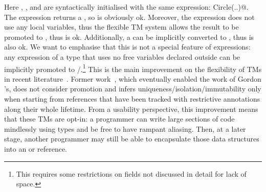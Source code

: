 Here \Q@mc@, \Q@cc@, and \Q@ic@ are syntactically initialised with the same expression: \Q@new Circle(..)@.
The \Q@new@ expression returns a \Q@mut@, so \Q@mc@ is obviously ok.
Moreover, the expression does not use any \Q@mut@ local variables, thus the flexible TM system
allows the \Q@mut@ result to be promoted to \Q@capsule@, thus \Q@cc@ is ok. 
Additionally, a \Q@capsule@ can be implicitly converted to \Q@imm@, thus \Q@ic@ is also ok.
We want to emphasise that this is not a special feature of \Q@new@ expressions:
any expression of a \Q@mut@ type that uses no free \Q@mut@ variables declared outside can be implicitly promoted to \Q@capsule@/\Q@imm@.\footnote{%
This requires some restrictions on \Q@read@ fields not discussed in detail for lack of space.
} This is the main improvement on the flexibility of TMs in recent literature~\cite{ServettoEtAl13a,ServettoZucca15,GordonEtAl12,clebsch2015deny,clebsch2017orca}.
Former work~\cite{Boyland10,boyland2003checking,Hogg91,Smith:2000:AT:645394.651903,DBLP:conf/pldi/AikenFKT03}, which eventually enabled the work of Gordon \etal's,  does not consider promotion and 
infers uniqueness/isolation/immutability only when starting from references that have been tracked with restrictive annotations along their whole lifetime.
From a usability perspective, this improvement means that
these TMs are opt-in: a programmer can write large sections of code
mindlessly using \Q@mut@ types and be free to have rampant aliasing. 
Then, at a later stage, another programmer may still 
be able to encapsulate those data structures into an \Q@imm@ or \Q@capsule@ reference.





